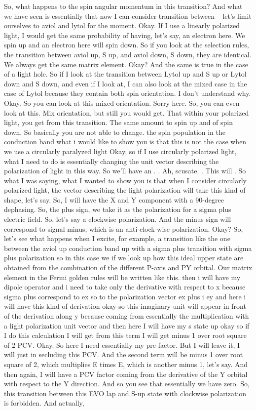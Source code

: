 So, what happens to the spin angular momentum in this transition? And what we have seen is essentially that now I can consider transition between – let's limit ourselves to aviol and lytol for the moment. Okay. If I use a linearly polarized light, I would get the same probability of having, let's say, an electron here. We spin up and an electron here will spin down. So if you look at the selection rules, the transition between aviol up, S up, and aviol down, S down, they are identical. We always get the same matrix element. Okay? And the same is true in the case of a light hole. So if I look at the transition between Lytol up and S up or Lytol down and S down, and even if I look at, I can also look at the mixed case in the case of Lytol because they contain both spin orientation. I don't understand why. Okay. So you can look at this mixed orientation. Sorry here. So, you can even look at this. Mix orientation, but still you would get. That within your polarized light, you get from this transition. The same amount to spin up and of spin down. So basically you are not able to change. the spin population in the conduction band what i would like to show you is that this is not the case when we use a circularly paralyzed light Okay, so if I use circularly polarized light, what I need to do is essentially changing the unit vector describing the polarization of light in this way. So we'll have an . . Ah, scusate. . This will . So what I was saying, what I wanted to show you is that when I consider circularly polarized light, the vector describing the light polarization will take this kind of shape, let's say. So, I will have the X and Y component with a 90-degree dephasing. So, the plus sign, we take it as the polarization for a sigma plus electric field. So, let's say a clockwise polarization. And the minus sign will correspond to signal minus, which is an anti-clock-wise polarization. Okay? So, let's see what happens when I excite, for example, a transition like the one between the aviol up conduction band up with a sigma plus transition with sigma plus polarization so in this case we if we look up how this ideal upper state are obtained from the combination of the different P-axis and PY orbital. Our matrix element in the Fermi golden rules will be written like this. then i will have my dipole operator and i need to take only the derivative with respect to x because sigma plus correspond to ex so to the polarization vector ex plus i ey and here i will have this kind of derivation okay so this imaginary unit will appear in front of the derivation along y because coming from essentially the multiplication with a light polarization unit vector and then here I will have my s state up okay so if I do this calculation I will get from this term I will get minus 1 over root square of 2 PCV. Okay. So here I need essentially my pre-factor. But I will leave it, I will just in secluding this PCV. And the second term will be minus 1 over root square of 2, which multiplies E times E, which is another minus 1, let's say. And then again, I will have a PCV factor coming from the derivative of the Y orbital with respect to the Y direction. And so you see that essentially we have zero. So, this transition between this EVO lap and S-up state with clockwise polarization is forbidden. And actually, 